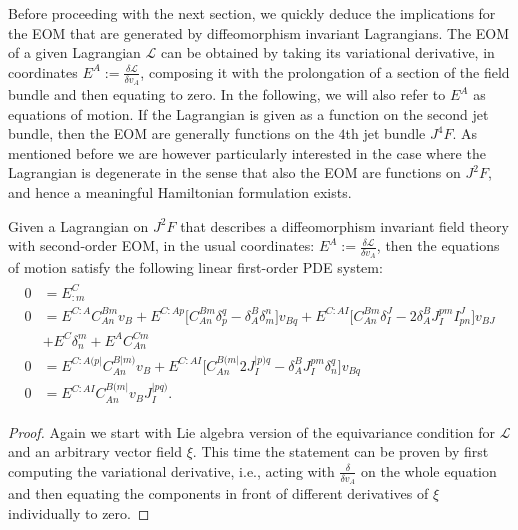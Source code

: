 Before proceeding with the next section, we quickly deduce the implications for the EOM that are generated by diffeomorphism invariant Lagrangians. The EOM of a given Lagrangian $\mathcal{L}$ can be obtained by taking its variational derivative, in coordinates $E^A := \frac{\delta \mathcal{L}}{\delta v_A}$, composing it with the prolongation of a section of the field bundle and then equating to zero. In the following, we will also refer to $E^A$ as equations of motion. If the Lagrangian is given as a function on the second jet bundle, then the EOM are generally functions on the $4$th jet bundle $J^4F$. As mentioned before we are however particularly interested in the case where the Lagrangian is degenerate in the sense that also the EOM are functions on $J^2F$, and hence a meaningful Hamiltonian formulation exists.
\begin{theorem}
Given a Lagrangian on $J^2F$ that describes a diffeomorphism invariant field theory with second-order EOM, in the usual coordinates: $E^A := \frac{\delta \mathcal{L}}{\delta v_A}$, then the equations of motion satisfy the following linear first-order PDE system:
\begin{align}\label{EOM}
    \begin{aligned}
    0 &= E^C_{:m} \\
    0 &= E^{C:A} C_{An}^{Bm} v_B + E^{C:Ap} \bigl[ C_{An}^{Bm} \delta_p^q - \delta_A^B \delta_m^n \bigr] v_{Bq} + E^{C:AI} \bigl[ C_{An}^{Bm} \delta_I^J - 2 \delta_A^B J_I^{pm} I^J_{pn}  \bigr] v_{BJ}\\
    &+ E^C \delta^m_n + E^A C_{An}^{Cm}  \\
    0 &= E^{C:A(p\vert}C_{An}^{B \vert m)} v_B + E^{C: AI} \bigl[ C_{An}^{B(m\vert} 2 J_I^{\vert p) q} - \delta^B_A J_I ^{pm} \delta_n^q \bigr] v_{Bq} \\
    0 &= E^{C:AI} C_{An}^{B(m\vert} v_B J_I^{\vert p q )}.
    \end{aligned}
\end{align}
\end{theorem}
\begin{proof}
Again we start with Lie algebra version of the equivariance condition for $\mathcal{L}$ and an arbitrary vector field $\xi$. This time the statement can be proven by first computing the variational derivative, i.e., acting with $\frac{\delta}{\delta v_A}$ on the whole equation and then equating the components in front of different derivatives of $\xi$ individually to zero. 
\end{proof}

